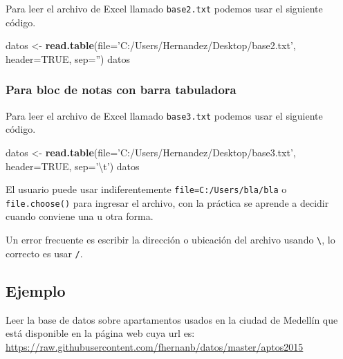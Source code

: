 \documentclass[10pt,]{krantz}
\makeatletter
\newenvironment{Shaded}{\begin{snugshade}}{\end{snugshade}}
\newcommand{\KeywordTok}[1]{\textcolor[rgb]{0.13,0.29,0.53}{\textbf{#1}}}
\newcommand{\DataTypeTok}[1]{\textcolor[rgb]{0.13,0.29,0.53}{#1}}
\newcommand{\CharTok}[1]{\textcolor[rgb]{0.31,0.60,0.02}{#1}}
\newcommand{\StringTok}[1]{\textcolor[rgb]{0.31,0.60,0.02}{#1}}
\newcommand{\OtherTok}[1]{\textcolor[rgb]{0.56,0.35,0.01}{#1}}
\newcommand{\NormalTok}[1]{#1}
\newenvironment{kframe}{%
\medskip{}
\setlength{\fboxsep}{.8em}
 \def\at@end@of@kframe{}%
 \ifinner\ifhmode%
  \def\at@end@of@kframe{\end{minipage}}%
  \begin{minipage}{\columnwidth}%
 \fi\fi%
 \def\FrameCommand##1{\hskip\@totalleftmargin \hskip-\fboxsep
 \colorbox{shadecolor}{##1}\hskip-\fboxsep
     \hskip-\linewidth \hskip-\@totalleftmargin \hskip\columnwidth}%
 \MakeFramed {\advance\hsize-\width
   \@totalleftmargin\z@ \linewidth\hsize
   \@setminipage}}%
 {\par\unskip\endMakeFramed%
 \at@end@of@kframe}
\renewenvironment{Shaded}{\begin{kframe}}{\end{kframe}}
\let\BeginKnitrBlock\begin \let\EndKnitrBlock\end
\makeatother
\begin{document}
Para leer el archivo de Excel llamado \texttt{base2.txt} podemos usar el
siguiente código.

\begin{Shaded}
\begin{Highlighting}[]
\NormalTok{datos <-}\StringTok{ }\KeywordTok{read.table}\NormalTok{(}\DataTypeTok{file=}\StringTok{'C:/Users/Hernandez/Desktop/base2.txt'}\NormalTok{,}
                    \DataTypeTok{header=}\OtherTok{TRUE}\NormalTok{, }\DataTypeTok{sep=}\StringTok{''}\NormalTok{)}
\NormalTok{datos}
\end{Highlighting}
\end{Shaded}

\subsubsection*{Para bloc de notas con barra
tabuladora}\label{para-bloc-de-notas-con-barra-tabuladora}

Para leer el archivo de Excel llamado \texttt{base3.txt} podemos usar el
siguiente código.

\begin{Shaded}
\begin{Highlighting}[]
\NormalTok{datos <-}\StringTok{ }\KeywordTok{read.table}\NormalTok{(}\DataTypeTok{file=}\StringTok{'C:/Users/Hernandez/Desktop/base3.txt'}\NormalTok{,}
                    \DataTypeTok{header=}\OtherTok{TRUE}\NormalTok{, }\DataTypeTok{sep=}\StringTok{'}\CharTok{\textbackslash{}t}\StringTok{'}\NormalTok{)}
\NormalTok{datos}
\end{Highlighting}
\end{Shaded}

\BeginKnitrBlock{rmdnote}
El usuario puede usar indiferentemente
\texttt{file=\textquotesingle{}C:/Users/bla/bla\textquotesingle{}} o
\texttt{file.choose()} para ingresar el archivo, con la práctica se
aprende a decidir cuando conviene una u otra forma.
\EndKnitrBlock{rmdnote}

\BeginKnitrBlock{rmdwarning}
Un error frecuente es escribir la dirección o ubicación del archivo
usando \texttt{\textbackslash{}}, lo correcto es usar \texttt{/}.
\EndKnitrBlock{rmdwarning}

\subsection*{Ejemplo}\label{ejemplo-25}


Leer la base de datos sobre apartamentos usados en la ciudad de Medellín
que está disponible en la página web cuya url es:
\url{https://raw.githubusercontent.com/fhernanb/datos/master/aptos2015}
\end{document}
